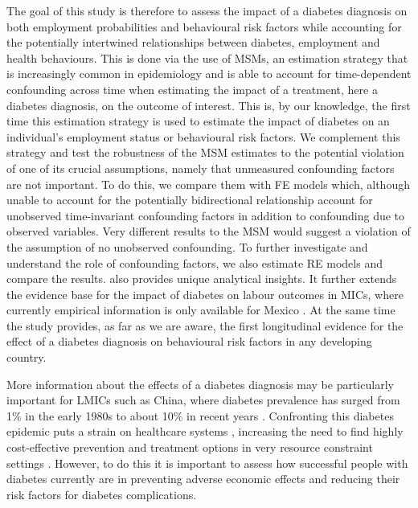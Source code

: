 The goal of this study is therefore to assess the impact of a diabetes diagnosis on both employment probabilities and behavioural risk factors while accounting for the potentially intertwined relationships between diabetes, employment and health behaviours. This is done via the use of \acp{MSM}, an estimation strategy that is increasingly common in epidemiology and is able to account for time-dependent confounding across time \parencite{Robins2000} when estimating the impact of a treatment, here a diabetes diagnosis, on the outcome of interest. This is, by our knowledge, the first time this estimation strategy is used to estimate the impact of diabetes on an individual's employment status or behavioural risk factors. We complement this strategy and test the robustness of the \ac{MSM} estimates to the potential violation of one of its crucial assumptions, namely that unmeasured confounding factors are not important. To do this, we compare them with \ac{FE} models which, although unable to account for the potentially bidirectional relationship account for unobserved time-invariant confounding factors in addition to confounding due to observed variables. Very different results to the \ac{MSM} would suggest a violation of the assumption of no unobserved confounding. To further investigate and understand the role of confounding factors, we also estimate \ac{RE} models and compare the results. also provides unique analytical insights.  It further extends the evidence base for the impact of diabetes on labour outcomes in \acp{MIC}, where currently empirical information is only available for Mexico \parencite{Seuring2016}. At the same time the study provides, as far as we are aware, the first longitudinal evidence for the effect of a diabetes diagnosis on behavioural risk factors in any developing  country.

 
More information about the effects of a diabetes diagnosis may be particularly important for \acp{LMIC} such as China, where diabetes prevalence has surged from 1\% in the early 1980s to about 10\% in recent years \autocite{Hu2011,Risk2016}. Confronting this diabetes epidemic puts a strain on healthcare systems \parencite{Seuring2015a}, increasing the need to find highly cost-effective prevention and treatment options in very resource constraint settings \parencite{WHOresearchpriorities2010}. However, to do this it is important to assess how successful people with diabetes currently are in preventing adverse economic effects and reducing their risk factors for diabetes complications.


